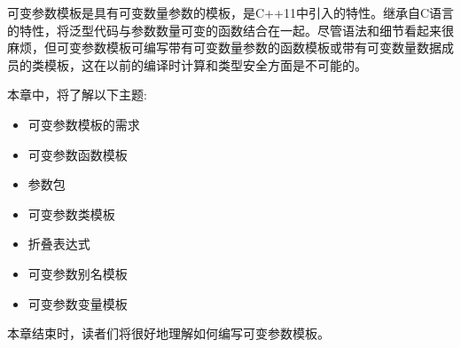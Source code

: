 可变参数模板是具有可变数量参数的模板，是C++11中引入的特性。继承自C语言的特性，将泛型代码与参数数量可变的函数结合在一起。尽管语法和细节看起来很麻烦，但可变参数模板可编写带有可变数量参数的函数模板或带有可变数量数据成员的类模板，这在以前的编译时计算和类型安全方面是不可能的。

本章中，将了解以下主题:

\begin{itemize}
\item
可变参数模板的需求

\item
可变参数函数模板

\item
参数包

\item
可变参数类模板

\item
折叠表达式

\item
可变参数别名模板

\item
可变参数变量模板
\end{itemize}

本章结束时，读者们将很好地理解如何编写可变参数模板。































